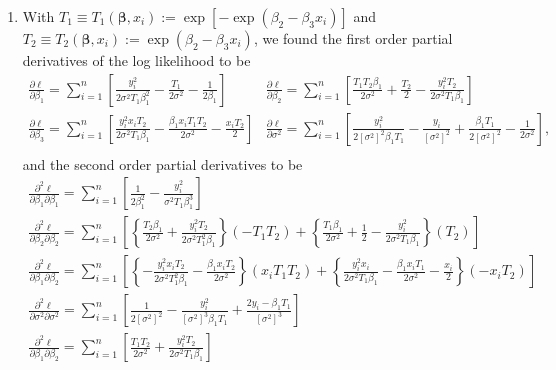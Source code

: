 \documentclass[12pt]{article}
\begin{document}
\begin{enumerate}
  \item With $T_1 \equiv T_1(\bm{\beta}, x_i) := \exp[-\exp(\beta_2 - \beta_3x_i)]$ and $T_2 \equiv T_2(\bm{\beta}, x_i) := \exp(\beta_2 -
    \beta_3x_i)$, we found the first order partial derivatives of the log likelihood to be
    \[
      \begin{array}{ll}
        \frac{\partial \ell}{\partial \beta_1} = \sum_{i=1}^{n}\left[\frac{y_i^2}{2\sigma^2T_1\beta_1^2} - \frac{T_1}{2\sigma^2} -
        \frac{1}{2\beta_1}\right] &
        \frac{\partial \ell}{\partial \beta_2} = \sum_{i=1}^{n}\left[\frac{T_1T_2\beta_1}{2\sigma^2} + \frac{T_2}{2} -
        \frac{y_i^2T_2}{2\sigma^2T_1\beta_1}\right] \\
        \frac{\partial \ell}{\partial \beta_3} = \sum_{i=1}^{n}\left[ \frac{y_i^2x_iT_2}{2\sigma^2T_1\beta_1} - \frac{\beta_1x_iT_1T_2}{2\sigma^2} -
        \frac{x_iT_2}{2} \right] & \frac{\partial \ell}{\partial \sigma^2} = \sum_{i=1}^{n}\left[ \frac{y_i^2}{2[\sigma^2]^2\beta_1T_1} -
        \frac{y_i}{[\sigma^2]^2} + \frac{\beta_1T_1}{2[\sigma^2]^2} - \frac{1}{2\sigma^2} \right], \\ 
      \end{array}
    \]
    and the second order partial derivatives to be
    \[
      \begin{array}{ll}
        \frac{\partial^2 \ell}{\partial \beta_1 \partial \beta_1} = \sum_{i=1}^{n}\left[ \frac{1}{2\beta_1^2} - \frac{y_i^2}{\sigma^2T_1\beta_1^3} \right] & \\ 
        \frac{\partial^2 \ell}{\partial \beta_2 \partial \beta_2} = \sum_{i=1}^{n}\left[ \left\{ \frac{T_2\beta_1}{2\sigma^2} +
          \frac{y_i^2T_2}{2\sigma^2T_1^2\beta_1} \right\}(-T_1T_2) + \left\{ \frac{T_1\beta_1}{2\sigma^2} + \frac{1}{2} -
        \frac{y_i^2}{2\sigma^2T_1\beta_1} \right\}(T_2) \right] & \\ 
        \frac{\partial^2 \ell}{\partial \beta_1 \partial \beta_2} = \sum_{i=1}^{n}\left[ \left\{ -\frac{y_i^2x_iT_2}{2\sigma^2T_1^2\beta_1} -
          \frac{\beta_1x_iT_2}{2\sigma^2} \right\}(x_iT_1T_2) + \left\{ \frac{y_i^2x_i}{2\sigma^2T_1\beta_1} - \frac{\beta_1x_iT_1}{2\sigma^2} -
        \frac{x_i}{2} \right\}(-x_iT_2) \right] & \\ 
        \frac{\partial^2 \ell}{\partial \sigma^2 \partial \sigma^2} = \sum_{i=1}^{n}\left[ \frac{1}{2[\sigma^2]^2} - \frac{y_i^2}{[\sigma^2]^3\beta_1T_1}
        + \frac{2y_i - \beta_1T_1}{[\sigma^2]^3}\right] & \\ 
        \frac{\partial^2 \ell}{\partial \beta_1 \partial \beta_2} = \sum_{i=1}^{n}\left[ \frac{T_1T_2}{2\sigma^2} + \frac{y_i^2T_2}{2\sigma^2T_1\beta_1} \right] & \\ 

\end{array}\]
\end{enumerate}
\end{document}
